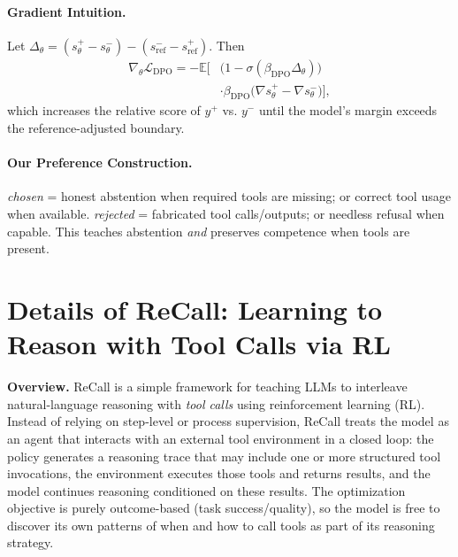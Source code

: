 \documentclass[11pt]{article}
\begin{document}
\paragraph{Gradient Intuition.}
Let $\Delta_\theta=(s_\theta^+ - s_\theta^-)-(s_{\mathrm{ref}}^{-}-s_{\mathrm{ref}}^{+})$. Then
\begin{equation}
\begin{split}
\nabla_\theta \mathcal{L}_{\mathrm{DPO}} = -\mathbb{E}\Big[ & \big(1-\sigma(\beta_{\mathrm{DPO}}\Delta_\theta)\big) \\
& \cdot \beta_{\mathrm{DPO}} \big(\nabla s_\theta^+ - \nabla s_\theta^-\big) \Big],
\end{split}
\end{equation}
which increases the relative score of $y^+$ vs. $y^-$ until the model’s margin exceeds the reference-adjusted boundary.

\paragraph{Our Preference Construction.}
\textit{chosen} = honest abstention when required tools are missing; or correct tool usage when available. \textit{rejected} = fabricated tool calls/outputs; or needless refusal when capable. This teaches abstention \emph{and} preserves competence when tools are present.

\section{Details of ReCall: Learning to Reason with Tool Calls via RL}
\label{app:ReCall}

\textbf{Overview.}
ReCall is a simple framework for teaching LLMs to interleave natural-language reasoning with \emph{tool calls} using reinforcement learning (RL). Instead of relying on step-level or process supervision, ReCall treats the model as an agent that interacts with an external tool environment in a closed loop: the policy generates a reasoning trace that may include one or more structured tool invocations, the environment executes those tools and returns results, and the model continues reasoning conditioned on these results. The optimization objective is purely outcome-based (task success/quality), so the model is free to discover its own patterns of when and how to call tools as part of its reasoning strategy.
\end{document}
